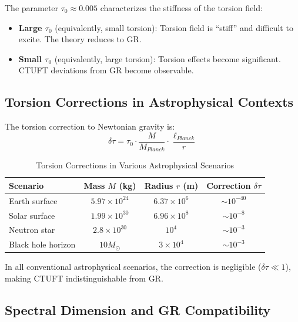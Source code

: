 The parameter $\tau_0 \approx 0.005$ characterizes the stiffness of the torsion field:

\begin{itemize}
    \item \textbf{Large $\tau_0$} (equivalently, small torsion): Torsion field is ``stiff'' and difficult to excite. The theory reduces to GR.
    \item \textbf{Small $\tau_0$} (equivalently, large torsion): Torsion effects become significant. CTUFT deviations from GR become observable.
\end{itemize}

\subsection{Torsion Corrections in Astrophysical Contexts}

The torsion correction to Newtonian gravity is:
\begin{equation}
    \delta\tau = \tau_0 \cdot \frac{M}{M_{Planck}} \cdot \frac{\ell_{Planck}}{r}
    \label{eq:torsion_correction}
\end{equation}

\begin{table}[htbp]
\centering
\caption{Torsion Corrections in Various Astrophysical Scenarios}
\begin{tabular}{@{}lccc@{}}
\hline
Scenario & Mass $M$ (kg) & Radius $r$ (m) & Correction $\delta\tau$ \\
\hline
Earth surface & $5.97 \times 10^{24}$ & $6.37 \times 10^6$ & $\sim 10^{-40}$ \\
Solar surface & $1.99 \times 10^{30}$ & $6.96 \times 10^8$ & $\sim 10^{-8}$ \\
Neutron star & $2.8 \times 10^{30}$ & $10^4$ & $\sim 10^{-3}$ \\
Black hole horizon & $10M_\odot$ & $3 \times 10^4$ & $\sim 10^{-3}$ \\
\hline
\end{tabular}
\label{tab:torsion_corrections}
\end{table}

In all conventional astrophysical scenarios, the correction is negligible ($\delta\tau \ll 1$), making CTUFT indistinguishable from GR.

\subsection{Spectral Dimension and GR Compatibility}

